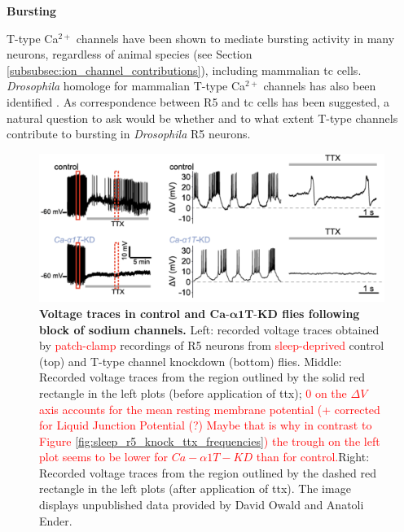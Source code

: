 \documentclass[../main.tex]{subfiles}
\begin{document}
\noindent\textbf{Bursting}

T-type Ca$^{2+}$ channels have been shown to mediate bursting activity in many neurons, regardless of animal species (see Section \ref{subsubsec:ion_channel_contributions}), including mammalian \gls{tc} cells.  \textit{Drosophila} homologe for mammalian T-type Ca$^{2+}$ channels has also been identified \parencite{jeongCaa1TFlyTtype2015}.
As correspondence between R5 and \gls{tc} cells has been suggested, a natural question to ask would be whether and to what extent T-type channels contribute to bursting in \textit{Drosophila} R5 neurons.

\begin{figure}[!t]
    \centering
    \includegraphics[width=0.98\linewidth]{../img/sleep_and_r5_network/CaaT_knock_and_ttx/voltage_traces_labelled.png}
    \caption[Voltage traces in control and $Ca\text{-}\alpha1T\text{-KD}$ flies following block of sodium channels]{
        \textbf{Voltage traces in control and $\bm{Ca\text{-}\alpha1T\text{-KD}}$ flies following block of sodium channels.}
        Left: recorded voltage traces obtained by \textcolor{red}{patch-clamp} recordings of R5 neurons from \textcolor{red}{sleep-deprived} control (top) and T-type channel knockdown (bottom) flies.
        Middle: Recorded voltage traces from the region outlined by the solid red rectangle in the left plots (before application of \gls{ttx}); \textcolor{red}{$0$ on the $\Delta V$ axis accounts for the mean resting membrane potential (+ corrected for Liquid Junction Potential (?) Maybe that is why in contrast to Figure \ref{fig:sleep_r5_knock_ttx_frequencies}) the trough on the left plot seems to be lower for $Ca-\alpha1T-KD$ than for control.}Right: Recorded voltage traces from the region outlined by the dashed red rectangle in the left plots (after application of \gls{ttx}). The image displays unpublished data provided by David Owald and Anatoli Ender.
    }
    \label{fig:sleep_r5_knock_ttx_voltage}
\end{figure}
\end{document}
